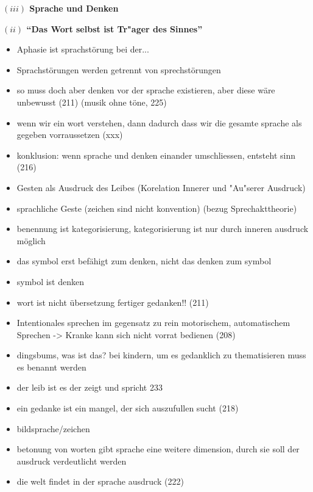 \documentclass[a4paper, 12pt]{article}
\begin{document}
\begin{onehalfspace}
\vspace{5mm}

\noindent\textbf{$(iii)$ Sprache und Denken}

\vspace{5mm}

\noindent\textbf{$(ii)$ "`Das Wort selbst ist Tr"ager des Sinnes"'}





\begin{itemize}
  \item Aphasie ist sprachstörung bei der...
  \item Sprachstörungen werden getrennt von sprechstörungen
  \item so muss doch aber denken vor der sprache existieren, aber diese wäre unbewusst (211) (musik ohne töne, 225)
  \item wenn wir ein wort verstehen, dann dadurch dass wir die gesamte sprache als gegeben vorraussetzen (xxx)
  \item konklusion: wenn sprache und denken einander umschliessen, entsteht sinn (216)
  \item Gesten als Ausdruck des Leibes (Korelation Innerer und "Au"serer Ausdruck)
  \item sprachliche Geste (zeichen sind nicht konvention) (bezug Sprechakttheorie)
  \item benennung ist kategorisierung, kategorisierung ist nur durch inneren ausdruck möglich
  \item das symbol erst befähigt zum denken, nicht das denken zum symbol
  \item symbol ist denken
  \item wort ist nicht übersetzung fertiger gedanken!! (211)
  \item Intentionales sprechen im gegensatz zu rein motorischem, automatischem Sprechen -> Kranke kann sich nicht vorrat bedienen (208)
  \item dingsbums, was ist das? bei kindern, um es gedanklich zu thematisieren muss es benannt werden
  \item der leib ist es der zeigt und spricht 233
  \item ein gedanke ist ein mangel, der sich auszufullen sucht (218)
  \item bildsprache/zeichen 
  \item betonung von worten gibt sprache eine weitere dimension, durch sie soll der ausdruck verdeutlicht werden
  \item die welt findet in der sprache ausdruck (222) 
\end{itemize}



\end{onehalfspace}
\nocite{*}
%
\printbibliography
\end{document}
